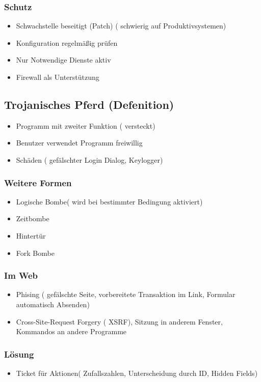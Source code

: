 \subsubsection*{ Schutz }
\begin{itemize}
	\item Schwachstelle beseitigt (Patch) ( schwierig auf Produktivsystemen)
	\item Konfiguration regelmäßig prüfen
	\item Nur Notwendige Dienste aktiv
	\item Firewall als Unterstützung
\end{itemize}


	\subsection*{Trojanisches Pferd (Defenition)}
\begin{itemize}
	\item Programm mit zweiter Funktion ( versteckt)
	\item Benutzer verwendet Programm freiwillig
	\item Schäden ( gefälschter Login Dialog, Keylogger)
\end{itemize}

\subsubsection*{ Weitere Formen }
\begin{itemize}
	\item Logische Bombe( wird bei bestimmter Bedingung aktiviert)
	\item Zeitbombe
	\item Hintertür 
	\item Fork Bombe
\end{itemize}

\subsubsection*{ Im Web }
\begin{itemize}
	\item Phising ( gefälschte Seite, vorbereitete Transaktion im Link, Formular automatisch Absenden)
	\item Cross-Site-Request Forgery ( XSRF), Sitzung in anderem Fenster, Kommandos an andere Programme
\end{itemize}

\subsubsection*{ Lösung }
\begin{itemize}
	\item Ticket für Aktionen( Zufallszahlen, Unterscheidung durch ID, Hidden Fields)
\end{itemize}

